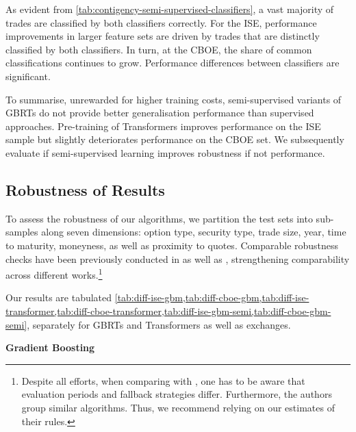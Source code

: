 As evident from \cref{tab:contigency-semi-supervised-classifiers}, a vast majority of trades are classified by both classifiers correctly. For the \gls{ISE}, performance improvements in larger feature sets are driven by trades that are distinctly classified by both classifiers. In turn, at the \gls{CBOE}, the share of common classifications continues to grow. Performance differences between classifiers are significant.    


To summarise, unrewarded for higher training costs, semi-supervised variants of \glspl{GBRT} do not provide better generalisation performance than supervised approaches. Pre-training of Transformers improves performance on the \gls{ISE} sample but slightly deteriorates performance on the \gls{CBOE} set. We subsequently evaluate if semi-supervised learning improves robustness if not performance.

\subsection{Robustness of Results}\label{sec:robustness-checks}


To assess the robustness of our algorithms, we partition the test sets into sub-samples along seven dimensions: option type, security type, trade size, year, time to maturity, moneyness, as well as proximity to quotes. Comparable robustness checks have been previously conducted in \textcite[][47]{grauerOptionTradeClassification2022} as well as  \textcite[][890--892]{savickasInferringDirectionOption2003}, strengthening comparability across different works.\footnote{Despite all efforts, when comparing with \textcite[][47--52]{grauerOptionTradeClassification2022}, one has to be aware that evaluation periods and fallback strategies differ. Furthermore, the authors group similar algorithms. Thus, we recommend relying on our estimates of their rules.}

Our results are tabulated \cref{tab:diff-ise-gbm,tab:diff-cboe-gbm,tab:diff-ise-transformer,tab:diff-cboe-transformer,tab:diff-ise-gbm-semi,tab:diff-cboe-gbm-semi}, separately for \glspl{GBRT} and Transformers as well as exchanges.

\clearpage

\textbf{Gradient Boosting}


